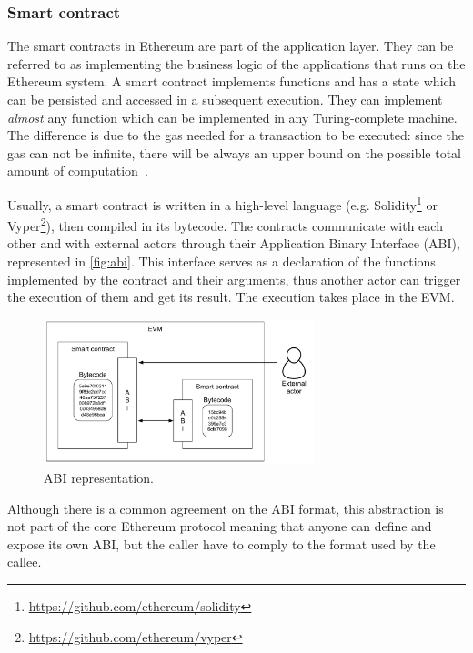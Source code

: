 \subsubsection{Smart contract}
\label{sec:smart-contract}

The smart contracts in Ethereum are part of the application layer. They can be
referred to as implementing the business logic of the applications that runs on
the Ethereum system. A smart contract implements functions and has a state which
can be persisted and accessed in a subsequent execution. They can implement
\emph{almost} any function which can be implemented in any Turing-complete
machine. The difference is due to the gas needed for a transaction to be
executed: since the gas can not be infinite, there will be always an upper
bound on the possible total amount of computation~\cite{wood2018ethereum}.

Usually, a smart contract is written in a high-level language (e.g.
Solidity\footnote{\url{https://github.com/ethereum/solidity}} or
Vyper\footnote{\url{https://github.com/ethereum/vyper}}), then compiled in its
bytecode. The contracts communicate with each other and with external actors
through their Application Binary Interface (ABI), represented in
\autoref{fig:abi}. This interface serves as a declaration of the functions
implemented by the contract and their arguments, thus another actor can trigger
the execution of them and get its result. The execution takes place in the EVM.

\begin{figure}
	\begin{center}
		\includegraphics[width=0.7\textwidth]{./res/img/abi.pdf}
	\end{center}
	\caption{ABI representation.}
	\label{fig:abi}
\end{figure}

Although there is a common agreement on the ABI format, this abstraction is not
part of the core Ethereum protocol meaning that anyone can define and expose its
own ABI, but the caller have to comply to the format used by the callee.

